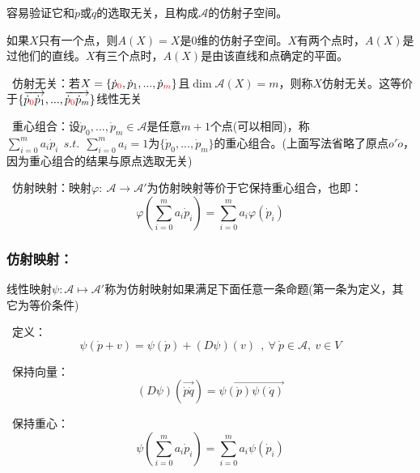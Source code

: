 \documentclass[zihao=-4,UTF8]{report}
\def\A{\mathscr{A}}
\theoremstyle{mystyle} %
\begin{document}
容易验证它和$\dot{p}$或$\dot{q}$的选取无关，且构成$\A$的仿射子空间。\par
如果$X$只有一个点，则$A(X)=X$是0维的仿射子空间。$X$有两个点时，$A(X)$是过他们的直线。$X$有三个点时，$A(X)$是由该直线和点确定的平面。
\par{}\ 仿射无关：若$X = \{\dot{p}_{\textcolor{red}{0}},\dot{p}_1,...,\dot{p}_{\textcolor{red}{m}}\}$且$\dim \A(X) = m$，则称$X$仿射无关。这等价于$\{\overrightarrow{\dot{p}_{\textcolor{red}{0}}\dot{p}_1},...,\overrightarrow{\dot{p}_{\textcolor{red}{0}}\dot{p}_m}  \}$线性无关    \par
{}\ 重心组合：设$\dot{p}_0,...,\dot{p}_m \in \A$是任意$m+1$个点(可以相同)，称$\sum_{i=0}^{m}a_i\dot{p}_i\ \ s.t.\ \ \sum_{i=0}^{m}a_i = 1  $为$\{\dot{p}_0,...,\dot{p}_m \}$的重心组合。(上面写法省略了原点$o'\dot{o}$，因为重心组合的结果与原点选取无关)    \par
{}\  仿射映射：映射$\varphi:\ \A \longrightarrow \A'$为仿射映射等价于它保持重心组合，也即：
\begin{equation*}
    \varphi\left(\sum_{i=0}^{m} a_i\dot{p}_i \right) = \sum_{i=0}^{m} a_i\varphi(\dot{p}_i)
\end{equation*}
\par

\subsubsection{仿射映射：}
线性映射$\psi: \A \longmapsto \A'$称为仿射映射如果满足下面任意一条命题(第一条为定义，其它为等价条件)
\par{}\  定义：
\begin{equation*}
    \psi(\dot{p}+v) = \psi(\dot{p}) + (D\psi)(v) \ \ ,\ \forall\ \dot{p}\in \A,\ v \in V
\end{equation*}   \par
{}\   保持向量：
\begin{equation*}
    (D\psi)(\overrightarrow{\dot{p}\dot{q}}) = \overrightarrow{\psi(\dot{p})\psi(\dot{q})}
\end{equation*}  \par
{}\  保持重心：
\begin{equation*}
    \psi\left(\sum_{i=0}^{m} a_i\dot{p}_i \right) = \sum_{i=0}^{m} a_i\psi(\dot{p}_i)
\end{equation*} 
\end{document}
